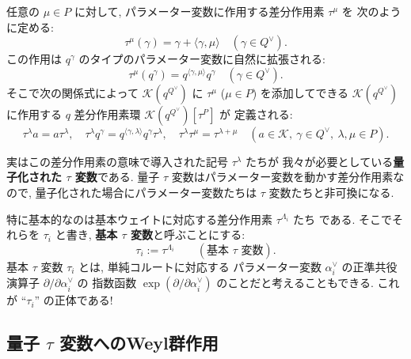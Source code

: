 \documentclass[12pt,twoside,dvipdfm]{msjproc}
\theoremstyle{definition} %
\theoremstyle{definition} %
\theoremstyle{definition} %
\numberwithin{theorem}{section}
\numberwithin{equation}{section}
\numberwithin{figure}{section}
\numberwithin{table}{section}
\newcommand\bra{\langle}
\newcommand\ket{\rangle}
\newcommand\K{\mathcal{K}}
\newcommand\av{\alpha^\vee}
\newcommand\Qv{{Q^\vee}}
\begin{document}
任意の $\mu\in P$ に対して, 
パラメーター変数に作用する差分作用素 $\tau^\mu$ を
次のように定める:
\begin{equation*}
  \tau^\mu(\gamma) = \gamma + \bra\gamma,\mu\ket
  \quad (\gamma\in\Qv).
\end{equation*}
この作用は $q^\gamma$ のタイプのパラメーター変数に自然に拡張される:
\begin{equation*}
  \tau^\mu(q^\gamma) = q^{\bra\gamma,\mu\ket}q^\gamma
  \quad (\gamma\in\Qv).
\end{equation*}
そこで次の関係式によって $\K(q^\Qv)$ に $\tau^\mu$ ($\mu\in P$)
を添加してできる $\K(q^\Qv)$ に作用する $q$ 差分作用素環 $\K(q^\Qv)[\tau^P]$ が
定義される:
\begin{equation*}
 \tau^\lambda a = a \tau^\lambda, \quad
 \tau^\lambda q^\gamma = q^{\bra\gamma,\lambda\ket} q^\gamma \tau^\lambda, \quad
 \tau^\lambda \tau^\mu = \tau^{\lambda+\mu} \quad
 (a\in\K,\ \gamma\in\Qv,\ \lambda,\mu\in P).
\end{equation*}

実はこの差分作用素の意味で導入された記号 $\tau^\lambda$ たちが
我々が必要としている{\bf 量子化された $\tau$ 変数}である.
量子 $\tau$ 変数はパラメーター変数を動かす差分作用素なので, 
量子化された場合にパラメーター変数たちは $\tau$ 変数たちと非可換になる. 

特に基本的なのは基本ウェイトに対応する差分作用素 $\tau^{\Lambda_i}$ たち
である.  そこでそれらを $\tau_i$ と書き, 
{\bf 基本 $\tau$ 変数}と呼ぶことにする:
\begin{equation*}
  \tau_i := \tau^{\Lambda_i}  \qquad
 (\text{基本 $\tau$ 変数}).
\end{equation*}
基本 $\tau$ 変数 $\tau_i$ とは, 単純コルートに対応する
パラメーター変数 $\av_i$ の正準共役演算子 $\partial/\partial\av_i$ の
指数函数 $\exp(\partial/\partial\av_i)$ のことだと考えることもできる.
これが ``$\tau_i$'' の正体である!




\subsection{量子 $\tau$ 変数へのWeyl群作用}
\end{document}
